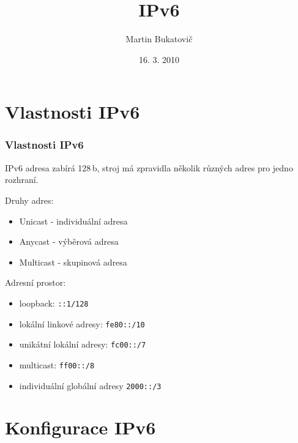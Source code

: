 \documentclass{beamer}
\begin{document}
\lstset{basicstyle=\ttfamily}
\title[~]{IPv6} 
\author{Martin Bukatovič} 
\institute[PV208]{}
\date{16. 3. 2010}

\frame{\titlepage} 
\frame{\tableofcontents} 

%
%

\section{Vlastnosti IPv6} 

\begin{frame} \frametitle{Vlastnosti IPv6}
IPv6 adresa zabírá 128\,b,
stroj má zpravidla několik různých adres pro jedno rozhraní.


Druhy adres:
\begin{itemize}
\item Unicast - individuální adresa
\item Anycast - výběrová adresa %
\item Multicast - skupinová adresa %
\end{itemize}

Adresní prostor:
\begin{itemize}
\item loopback: {\tt ::1/128}
\item lokální linkové adresy: {\tt fe80::/10}
\item unikátní lokální adresy: {\tt fc00::/7}
\item multicast: {\tt ff00::/8}
\item individuální globální adresy {\tt 2000::/3}
\end{itemize}

\end{frame}

%
%
%

\section{Konfigurace IPv6} 
\end{document}
